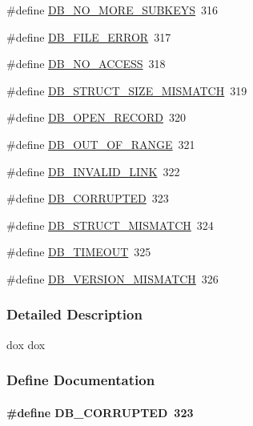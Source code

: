 \begin{DoxyCompactItemize}
\item 
\#define \hyperlink{group__err23_gaf2249d36fd8ffb254cd33a3bbc899638}{DB\_\-NO\_\-MORE\_\-SUBKEYS}~316
\item 
\#define \hyperlink{group__err23_ga39b1479e417376866f2658812ae4ba6b}{DB\_\-FILE\_\-ERROR}~317
\item 
\#define \hyperlink{group__err23_ga467b0af34b1011481919088b6af86b95}{DB\_\-NO\_\-ACCESS}~318
\item 
\#define \hyperlink{group__err23_ga920c5c179829999cc9b35cec855c7aec}{DB\_\-STRUCT\_\-SIZE\_\-MISMATCH}~319
\item 
\#define \hyperlink{group__err23_gacfc6bca00bde3af90d259cb4ae98deb0}{DB\_\-OPEN\_\-RECORD}~320
\item 
\#define \hyperlink{group__err23_ga1043c6971ce0fc8cc5613ec81e315789}{DB\_\-OUT\_\-OF\_\-RANGE}~321
\item 
\#define \hyperlink{group__err23_gac76d78c0ecc26f907b9996eb5ad1d86b}{DB\_\-INVALID\_\-LINK}~322
\item 
\#define \hyperlink{group__err23_gaa127076644c7cc5c76fa9e1354ea6574}{DB\_\-CORRUPTED}~323
\item 
\#define \hyperlink{group__err23_ga0ee271607cfbec2e6050b0ea6e5ef533}{DB\_\-STRUCT\_\-MISMATCH}~324
\item 
\#define \hyperlink{group__err23_gac3c60a757927f22fc91643550d780a85}{DB\_\-TIMEOUT}~325
\item 
\#define \hyperlink{group__err23_gaf466ab5a9f2f1febef5fb3e4c12df14b}{DB\_\-VERSION\_\-MISMATCH}~326
\end{DoxyCompactItemize}


\subsubsection{Detailed Description}
dox dox 

\subsubsection{Define Documentation}
\paragraph[{DB\_\-CORRUPTED}]{\setlength{\rightskip}{0pt plus 5cm}\#define DB\_\-CORRUPTED~323}\hfill\label{group__err23_gaa127076644c7cc5c76fa9e1354ea6574}

